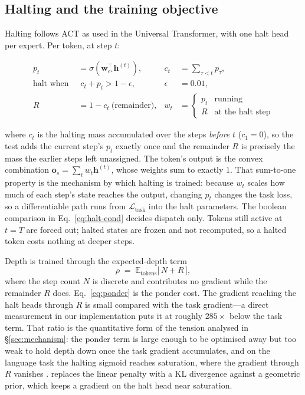 \subsection{Halting and the training objective}
\label{sec:halting-method}

Halting follows ACT \citep{graves2016act} as used in the Universal Transformer,
with one halt head per expert. Per token, at step $t$:

{\dispsize
\begin{align}
p_t &= \sigma\!\left(\mathbf{w}_{e^\star}^{\!\top}\mathbf{h}^{(t)}\right),
  & c_t &= \sum_{\tau < t} p_\tau ,
  \label{eq:halt-p} \\[2pt]
\text{halt when } &\; c_t + p_t > 1 - \epsilon, & \epsilon &= 0.01,
  \label{eq:halt-cond} \\[2pt]
R &= 1 - c_t \ \text{(remainder)}, &
  w_t &= \begin{cases} p_t & \text{running} \\ R & \text{at the halt step}\end{cases}
  \label{eq:halt-w}
\end{align}
}

where $c_t$ is the halting mass accumulated over the steps \emph{before} $t$
($c_1 = 0$), so the test adds the current step's $p_t$ exactly once and the
remainder $R$ is precisely the mass the earlier steps left unassigned. The token's
output is the convex combination
$\mathbf{o}_s = \sum_t w_t \mathbf{h}^{(t)}$, whose weights sum to exactly $1$.
That sum-to-one property is the mechanism by which halting is trained: because
$w_t$ scales how much of each step's state reaches the output, changing $p_t$
changes the task loss, so a differentiable path runs from $\mathcal{L}_{\text{task}}$
into the halt parameters. The boolean comparison in
Eq.~\ref{eq:halt-cond} decides dispatch only. Tokens still active at $t=T$ are
forced out; halted states are frozen and not recomputed, so a halted token costs
nothing at deeper steps.

Depth is trained through the expected-depth term
{\dispsize
\begin{equation}
\rho \;=\; \mathbb{E}_{\text{tokens}}\big[\,N + R\,\big],
\label{eq:ponder}
\end{equation}
}
where the step count $N$ is discrete and contributes no gradient while the
remainder $R$ does. Eq.~\ref{eq:ponder} is the ponder cost. The gradient reaching
the halt heads through $R$ is small compared with the task gradient---a direct
measurement in our implementation puts it at roughly $285\times$ below the task
term. That ratio is the quantitative form of the tension analysed in
\S\ref{sec:mechanism}: the ponder term is large enough to be optimised away but
too weak to hold depth down once the task gradient accumulates, and on the
language task the halting sigmoid reaches saturation, where the gradient through
$R$ vanishes \citep{graves2016act}.
\citet{banino2021pondernet} replaces the linear penalty with a KL divergence
against a geometric prior, which keeps a gradient on the halt head near
saturation.

